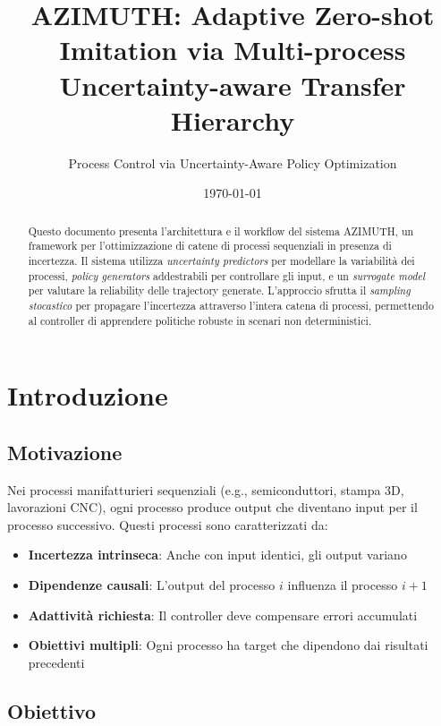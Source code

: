 \documentclass[11pt,a4paper]{article}
\title{\textbf{AZIMUTH: Adaptive Zero-shot Imitation via Multi-process Uncertainty-aware Transfer Hierarchy}}
\author{Process Control via Uncertainty-Aware Policy Optimization}
\date{\today}
\begin{document}
\maketitle

\begin{abstract}
Questo documento presenta l'architettura e il workflow del sistema AZIMUTH, un framework per l'ottimizzazione di catene di processi sequenziali in presenza di incertezza. Il sistema utilizza \textit{uncertainty predictors} per modellare la variabilità dei processi, \textit{policy generators} addestrabili per controllare gli input, e un \textit{surrogate model} per valutare la reliability delle trajectory generate. L'approccio sfrutta il \textit{sampling stocastico} per propagare l'incertezza attraverso l'intera catena di processi, permettendo al controller di apprendere politiche robuste in scenari non deterministici.
\end{abstract}

\tableofcontents
\newpage

\section{Introduzione}

\subsection{Motivazione}

Nei processi manifatturieri sequenziali (e.g., semiconduttori, stampa 3D, lavorazioni CNC), ogni processo produce output che diventano input per il processo successivo. Questi processi sono caratterizzati da:

\begin{itemize}
    \item \textbf{Incertezza intrinseca}: Anche con input identici, gli output variano
    \item \textbf{Dipendenze causali}: L'output del processo $i$ influenza il processo $i+1$
    \item \textbf{Adattività richiesta}: Il controller deve compensare errori accumulati
    \item \textbf{Obiettivi multipli}: Ogni processo ha target che dipendono dai risultati precedenti
\end{itemize}

\subsection{Obiettivo}
\end{document}
